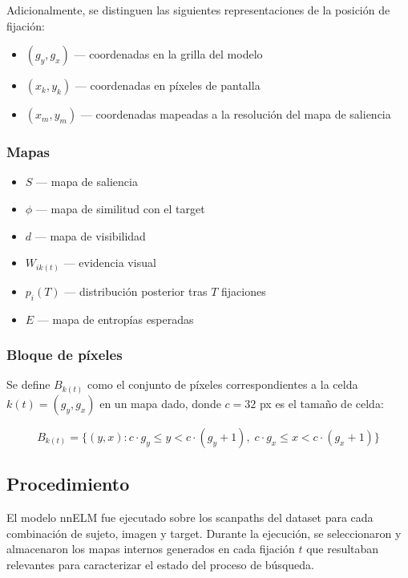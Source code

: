 Adicionalmente, se distinguen las siguientes representaciones de
la posición de fijación:
\begin{itemize}
    \item $(g_y, g_x)$ — coordenadas en la grilla del modelo
    \item $(x_k, y_k)$ — coordenadas en píxeles de pantalla
    \item $(x_m, y_m)$ — coordenadas mapeadas a la resolución
    del mapa de saliencia
\end{itemize}

\subsubsection*{Mapas}
\begin{itemize}
    \item $S$ — mapa de saliencia
    \item $\phi$ — mapa de similitud con el target
    \item $d$ — mapa de visibilidad
    \item $W_{ik(t)}$ — evidencia visual
    \item $p_i(T)$ — distribución posterior tras $T$ fijaciones
    \item $E$ — mapa de entropías esperadas
\end{itemize}

\subsubsection*{Bloque de píxeles}

Se define $B_{k(t)}$ como el conjunto de píxeles correspondientes
a la celda $k(t) = (g_y, g_x)$ en un mapa dado, donde $c = 32$ px
es el tamaño de celda:

\begin{equation}
    B_{k(t)} = \{(y, x) : c \cdot g_y \leq y < c \cdot (g_y + 1),\;
    c \cdot g_x \leq x < c \cdot (g_x + 1)\}
\end{equation}

\subsection{Procedimiento}

El modelo nnELM fue ejecutado sobre los scanpaths del dataset para
cada combinación de sujeto, imagen y target. Durante la ejecución,
se seleccionaron y almacenaron los mapas internos generados en cada
fijación $t$ que resultaban relevantes para caracterizar el estado
del proceso de búsqueda.

